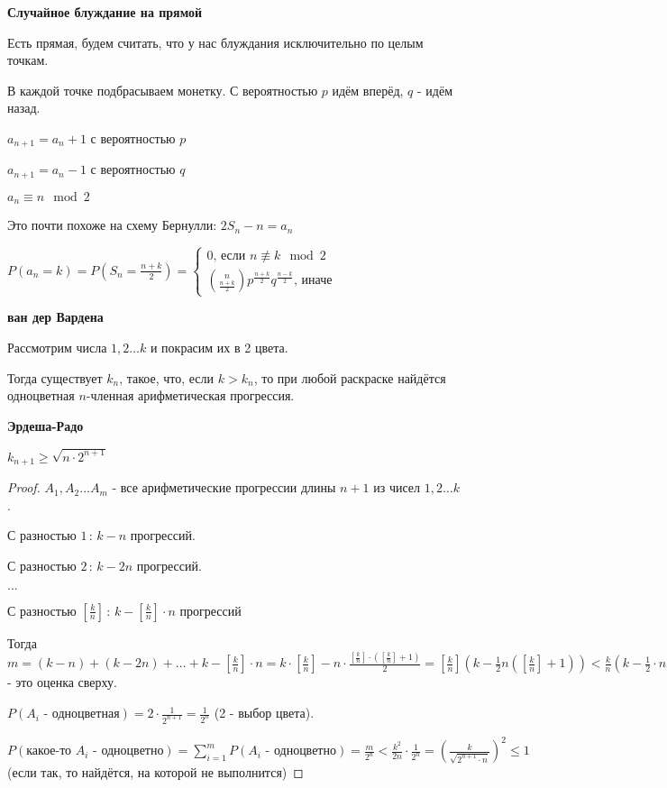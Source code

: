 \begin{example}
    \textbf{Случайное блуждание на прямой}

    Есть прямая, будем считать, что у нас блуждания исключительно по целым точкам.

    В каждой точке подбрасываем монетку. С вероятностью $p$ идём вперёд, $q$ - идём назад.

    $a_{n + 1} = a_{n} + 1$ с вероятностью $p$

    $a_{n + 1} = a_{n} - 1$ с вероятностью $q$

    $a_n \equiv n \mod 2$

    Это почти похоже на схему Бернулли: $2S_n - n = a_n$

    $P(a_n = k) = P(S_n = \frac{n + k}{2}) = \begin{cases}
        0 \text{, если } n \not \equiv k \mod 2 \\
        \binom{n}{\frac{n + k}{2}} p^{\frac{n + k}{2}} q^{\frac{n - k}{2}} \text{, иначе}
    \end{cases}$
\end{example}

\begin{theorem}
    \textbf{ван дер Вардена}

    Рассмотрим числа $1, 2 \ldots k$ и покрасим их в 2 цвета.

    Тогда существует $k_n$, такое, что, если $k > k_n$, то при любой раскраске
    найдётся одноцветная $n$-членная арифметическая прогрессия.
\end{theorem}

\begin{theorem}
    \textbf{Эрдеша-Радо}

    $k_{n + 1} \geqslant \sqrt{n \cdot 2^{n + 1}}$
\end{theorem}

\begin{proof}
    $A_1, A_2 \ldots A_m$ - все арифметические прогрессии длины $n + 1$ из чисел
    $1, 2 \ldots k$.

    С разностью $1 \, : \, k - n$ прогрессий.

    С разностью $2 \, : \, k - 2n$ прогрессий.

    $\ldots$

    С разностью $[\frac{k}{n}] \, : \, k - [\frac{k}{n}] \cdot n$ прогрессий

    Тогда $m = (k - n) + (k - 2n) + \ldots + k - [\frac{k}{n}] \cdot n = k \cdot [\frac{k}{n}] - n \cdot \frac{[\frac{k}{n}] \cdot ([\frac{k}{n}] + 1)}{2} =
    [\frac{k}{n}] (k - \frac{1}{2}n ([\frac{k}{n}] + 1)) < \frac{k}{n} (k - \frac{1}{2} \cdot n \cdot \frac{k}{n}) = \frac{k^2}{2n}$ - это
    оценка сверху.

    $P(\text{$A_i$ - одноцветная}) = 2 \cdot \frac{1}{2^{n + 1}} = \frac{1}{2^n}$ (2 - выбор цвета).

    $P(\text{какое-то $A_i$ - одноцветно}) = \sum_{i = 1}^m P(\text{$A_i$ - одноцветно}) = \frac{m}{2^n} <
    \frac{k^2}{2n} \cdot \frac{1}{2^n} = (\frac{k}{\sqrt{2^{n + 1} \cdot n}})^2 \leqslant 1$
    (если так, то найдётся, на которой не выполнится)
\end{proof}

